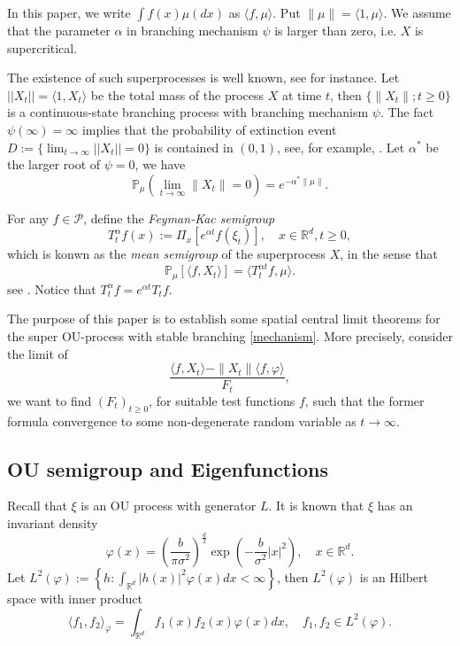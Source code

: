 \documentclass{article}
\begin{document}
In this paper, we write $\int f(x)\mu(dx)$ as $\langle f,\mu\rangle$. Put $\|\mu\|=\langle 1,\mu\rangle$. We assume that the parameter $\alpha$ in branching mechanism $\psi$ is larger than zero, i.e. $X$ is  supercritical.

 The existence of such superprocesses is well known, see \cite{EB} for instance. Let $||X_t||=\langle 1, X_t \rangle$ be the total mass of the process $X$ at time $t$, then $\{\|X_t\|; t \geq 0\}$ is a continuous-state branching process with branching mechanism $\psi$.  The fact $\psi(\infty)=\infty$ implies that the probability of extinction event $D:=\{\lim_{t \rightarrow \infty}||X_t||=0\}$ is contained in $(0,1)$, see, for example,  \cite[section 10.2.2]{AK}. Let $\alpha^{\ast}$ be the larger root of $\psi=0$, we have
$$\mathbb{P}_{\mu}\left(\lim_{t\rightarrow \infty}\|X_t\|=0\right)=e^{-\alpha^{\ast}\|\mu\|}.$$

For any $f \in \mathcal{P}$, define the {\em Feyman-Kac semigroup} 
\begin{equation}\label{meansemigroup}
    T^{\alpha}_t f(x) := \Pi_x [e^{\alpha t}f(\xi_t)], \quad x\in \mathbb{R}^d,t\geq 0,
\end{equation}
which is konwn as the {\em mean semigroup} of the superprocess $X$, in the sense that
\begin{equation}\label{meanformula}
    \mathbb{P}_{\mu}[\langle f, X_t \rangle] = \langle T_t^{\alpha t}f, \mu \rangle.
\end{equation}
see \cite[Proposition 2.27]{ZL}.  Notice that $T^{\alpha}_t f =e^{\alpha t}T_t f$.


The purpose of this paper is to establish some spatial central limit theorems for the super OU-process with stable branching \eqref{mechanism}. More precisely, consider the limit of 
$$\frac{\langle f,X_t\rangle-\|X_t\|\langle f, \varphi \rangle}{F_t},$$
we want to find $(F_t)_{t\geq0}$, for suitable test functions $f$, such that the former formula convergence to some non-degenerate random variable as $t\rightarrow \infty$.


\subsection{OU semigroup and Eigenfunctions}

Recall that $\xi$ is an OU process with generator $L$. It is known that $\xi$ has an invariant density
\begin{equation}\label{invariantdensity}
    \varphi (x) =\left (\frac{b}{\pi \sigma^2}\right )^{\frac{d}{2}}\exp \left(-\frac{b}{\sigma^2}|x|^2 \right ),\quad x\in \mathbb{R}^d.
\end{equation}
Let $L^2(\varphi):= \left\{ h: \int_{\mathbb{R}^d} |h(x)|^2 \varphi(x) dx < \infty \right\}$, then $L^2(\varphi)$ is an Hilbert space with inner product
$$\langle f_1, f_2 \rangle_{\varphi} = \int_{\mathbb{R}^d}f_1(x)f_2(x)\varphi(x) dx, \quad f_1,f_2 \in L^2(\varphi).$$
\end{document}
